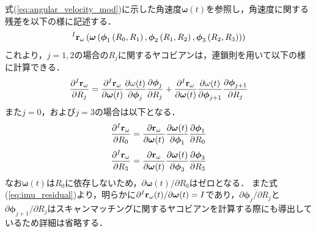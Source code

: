 式(\ref{eq:angular_velocity_mod})に示した角速度$\boldsymbol \omega(t)$を参照し，角速度に関する残差を以下の様に記述する．
%
\begin{align}
  {}^{I}{\bf r}_{\omega}
  \left(
    \boldsymbol \omega
    \left(
      \boldsymbol \phi_{1} \left( R_{0}, R_{1} \right),
      \boldsymbol \phi_{2} \left( R_{1}, R_{2} \right),
      \boldsymbol \phi_{3} \left( R_{2}, R_{3} \right)
    \right)
  \right)
\end{align}
%
これより，$j=1,2$の場合の$R_{j}$に関するヤコビアンは，連鎖則を用いて以下の様に計算できる．
%
\begin{align}
  \frac{ \partial {}^{I}{\bf r}_{\omega} }{ \partial R_{j} }
  =
  \frac{ \partial {}^{I}{\bf r}_{\omega} }{ \partial \boldsymbol \omega(t) }
  \frac{ \partial \omega(t) }{ \partial \boldsymbol \phi_{j} }
  \frac{ \partial \boldsymbol \phi_{j} }{ \partial R_{j} }
  +
  \frac{ \partial {}^{I}{\bf r}_{\omega} }{ \partial \boldsymbol \omega(t) }
  \frac{ \partial \omega(t) }{ \partial \boldsymbol \phi_{j+1} }
  \frac{ \partial \boldsymbol \phi_{j+1} }{ \partial R_{j} }
\end{align}
%
また$j=0$，および$j=3$の場合は以下となる．
%
\begin{align}
  \frac{ \partial {}^{I}{\bf r}_{\omega} }{ \partial R_{0} }
  =
  \frac{ \partial {\bf r}_{\omega} }{ \partial \boldsymbol \omega(t) }
  \frac{ \partial \boldsymbol \omega(t) }{ \partial \boldsymbol \phi_{1} }
  \frac{ \partial \boldsymbol \phi_{1} }{ \partial R_{0} }
\end{align}
%
\begin{align}
  \frac{ \partial {}^{I}{\bf r}_{\omega} }{ \partial R_{3} }
  =
  \frac{ \partial {\bf r}_{\omega} }{ \partial \boldsymbol \omega(t) }
  \frac{ \partial \boldsymbol \omega(t) }{ \partial \boldsymbol \phi_{3} }
  \frac{ \partial \boldsymbol \phi_{3} }{ \partial R_{3} }
\end{align}
%
なお$\boldsymbol \omega(t)$は$R_{0}$に依存しないため，$\partial \boldsymbol \omega(t) / \partial R_{0}$はゼロとなる．
また式(\ref{eq:imu_residual})より，明らかに$\partial {}^{I}{\bf r}_{\omega}(t) / \partial \boldsymbol \omega(t) = I$であり，$\partial \boldsymbol \phi_{j} / \partial R_{j}$と$\partial \boldsymbol \phi_{j+1} / \partial R_{j}$はスキャンマッチングに関するヤコビアンを計算する際にも導出しているため詳細は省略する．


